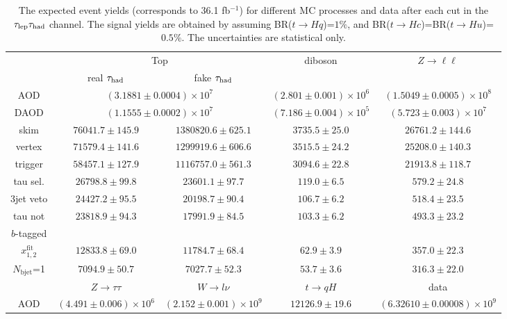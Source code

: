 \begin{table}
\footnotesize
\caption{ The expected event yields (corresponds to 36.1 fb$^{-1}$) for different MC processes and data after each cut in the $\tau_\text{lep}{}\tau_\text{had}$ channel. The signal yields are obtained by assuming BR($t\to Hq$)=$1\%$, and BR($t\to Hc$)=BR($t\to Hu$)=$0.5\%$. The uncertainties are statistical only.}
\centering
\begin{tabular}{|c|c|c|c|c|} \hline
  & \multicolumn{2}{c|}{Top} & \multirow{2}{*}{diboson} & \multirow{2}{*}{$Z\to\ell\ell$} \\ \cline{2-3}
  & real $\tau_\text{had}$ & fake $\tau_\text{had}$ & & \\ \hline
     AOD & \multicolumn{2}{c|}{$(3.1881\pm 0.0004)\times10^7$} & $(2.801\pm 0.001)\times10^6$ & $(1.5049\pm0.0005)\times10^8$ \\ \hline
    DAOD & \multicolumn{2}{c|}{$(1.1555\pm 0.0002)\times10^7$} & $(7.186\pm 0.004)\times10^5$ & $(5.723\pm 0.003)\times10^7$ \\ \hline
skim & $ 76041.7 \pm 145.9$ & $ 1380820.6 \pm 625.1$ & $ 3735.5 \pm 25.0$ & $ 26761.2 \pm 144.6$ \\ \hline
vertex & $ 71579.4 \pm 141.6$ & $ 1299919.6 \pm 606.6$ & $ 3515.5 \pm 24.2$ & $ 25208.0 \pm 140.3$ \\ \hline
trigger & $ 58457.1 \pm 127.9$ & $ 1116757.0 \pm 561.3$ & $ 3094.6 \pm 22.8$ & $ 21913.8 \pm 118.7$ \\ \hline
tau sel. & $ 26798.8 \pm 99.8$ & $ 23601.1 \pm 97.7$ & $ 119.0 \pm 6.5$ & $ 579.2 \pm 24.8$ \\ \hline
3jet veto & $ 24427.2 \pm 95.5$ & $ 20198.7 \pm 90.4$ & $ 106.7 \pm 6.2$ & $ 518.4 \pm 23.5$ \\ \hline
tau not & \multirow{2}{*}{$ 23818.9 \pm 94.3$} & \multirow{2}{*}{$ 17991.9 \pm 84.5$} & \multirow{2}{*}{$ 103.3 \pm 6.2$} & \multirow{2}{*}{$ 493.3 \pm 23.2$} \\
 $b$-tagged & & & & \\ \hline
$x_{1,2}^{\text{fit}}$ & $ 12833.8 \pm 69.0$ & $ 11784.7 \pm 68.4$ & $ 62.9 \pm 3.9$ & $ 357.0 \pm 22.3$ \\ \hline
$N_{\text{bjet}}$=1 & $ 7094.9 \pm 50.7$ & $ 7027.7 \pm 52.3$ & $ 53.7 \pm 3.6$ & $ 316.3 \pm 22.0$ \\ \hline\hline
 & $Z\to\tau\tau$ & $W\to l\nu$ & $t\to qH$ & data \\ \hline
     AOD & $(4.491\pm 0.006)\times10^6$ & $(2.152\pm 0.001)\times10^9$ & $   12126.9 \pm  19.6$ & $(6.32610\pm 0.00008)\times10^9$ \\ \hline

\end{tabular}
\end{table}
